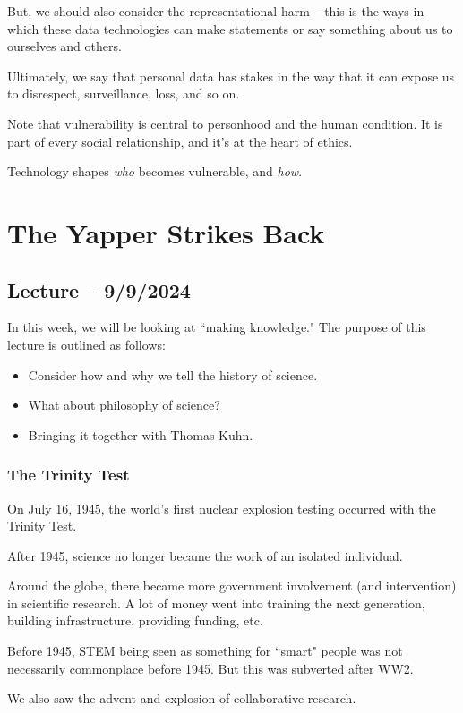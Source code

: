 \documentclass[openany]{book}
\begin{document}
But, we should also consider the representational harm -- this is the ways in which these data technologies can make statements or say something about us to ourselves and others.

Ultimately, we say that personal data has stakes in the way that it can expose us to disrespect, surveillance, loss, and so on.

\begin{warn}
	Note that vulnerability is central to personhood and the human condition. It is part of every social relationship, and it's at the heart of ethics.
	
	Technology shapes \textit{who} becomes vulnerable, and \textit{how}.
\end{warn}

\chapter{The Yapper Strikes Back}
\section{Lecture -- 9/9/2024}
In this week, we will be looking at ``making knowledge." The purpose of this lecture is outlined as follows:
\begin{itemize}
	\item Consider how and why we tell the history of science.
	\item What about philosophy of science?
	\item Bringing it together with Thomas Kuhn.
\end{itemize}

\subsection{The Trinity Test}
On July 16, 1945, the world's first nuclear explosion testing occurred with the Trinity Test.

After 1945, science no longer became the work of an isolated individual.

Around the globe, there became more government involvement (and intervention) in scientific research. A lot of money went into training the next generation, building infrastructure, providing funding, etc.

Before 1945, STEM being seen as something for ``smart" people was not necessarily commonplace before 1945. But this was subverted after WW2.

We also saw the advent and explosion of collaborative research.
\end{document}
